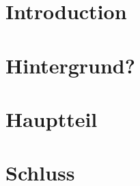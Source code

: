 \chapter{Introduction}
	
	
\chapter{Hintergrund?}

	
		
\chapter{Hauptteil}

	
				
		
\chapter{Schluss}

	
		
		
%	

% 		

